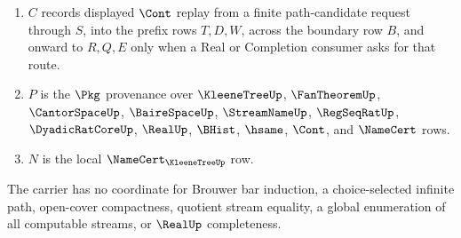 \begin{definition}
\begin{enumerate}
\item $C$ records displayed $\Cont$ replay from a finite path-candidate request through $S$, into the prefix rows $T,D,W$, across the boundary row $B$, and onward to $R,Q,E$ only when a Real or Completion consumer asks for that route.
\item $P$ is the $\Pkg$ provenance over $\KleeneTreeUp$, $\FanTheoremUp$, $\CantorSpaceUp$, $\BaireSpaceUp$, $\StreamNameUp$, $\RegSeqRatUp$, $\DyadicRatCoreUp$, $\RealUp$, $\BHist$, $\hsame$, $\Cont$, and $\NameCert$ rows.
\item $N$ is the local $\NameCert_{\KleeneTreeUp}$ row.
\end{enumerate}
The carrier has no coordinate for Brouwer bar induction, a choice-selected infinite path, open-cover compactness, quotient stream equality, a global enumeration of all computable streams, or $\RealUp$ completeness.
\end{definition}

